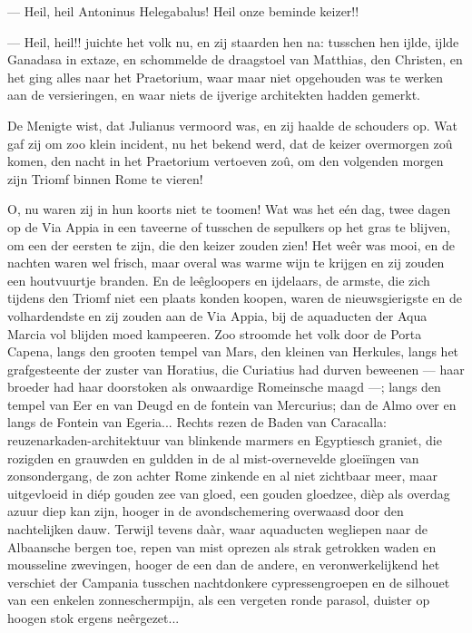\documentclass[a4paper, 12pt, oneside, dutch]{article}
\begin{document}
--- Heil, heil Antoninus Helegabalus! Heil onze beminde keizer!!

--- Heil, heil!! juichte het volk nu, en zij staarden hen na: tusschen hen ijlde, ijlde Ganadasa in extaze, en schommelde de draagstoel van Matthias, den Christen, en het ging alles naar het Praetorium, waar maar niet opgehouden was te werken aan de versieringen, en waar niets de ijverige architekten hadden gemerkt.

De Menigte wist, dat Julianus vermoord was, en zij haalde de schouders op. Wat gaf zij om zoo klein incident, nu het bekend werd, dat de keizer overmorgen zoû komen, den nacht in het Praetorium vertoeven zoû, om den volgenden morgen zijn Triomf binnen Rome te vieren!

O, nu waren zij in hun koorts niet te toomen! Wat was het eén dag, twee dagen op de Via Appia in een taveerne of tusschen de sepulkers op het gras te blijven, om een der eersten te zijn, die den keizer zouden zien! Het weêr was mooi, en de nachten waren wel frisch, maar overal was warme wijn te krijgen en zij zouden een houtvuurtje branden. En de leêgloopers en ijdelaars, de armste, die zich tijdens den Triomf niet een plaats konden koopen, waren de nieuwsgierigste en de volhardendste en zij zouden aan de Via Appia, bij de aquaducten der Aqua Marcia vol blijden moed kampeeren. Zoo stroomde het volk door de Porta Capena, langs den grooten tempel van Mars, den kleinen van Herkules, langs het grafgesteente der zuster van Horatius, die Curiatius had durven beweenen --- haar broeder had haar doorstoken als onwaardige Romeinsche maagd ---; langs den tempel van Eer en van Deugd en de fontein van Mercurius; dan de Almo over en langs de Fontein van Egeria... Rechts rezen de Baden van Caracalla: reuzenarkaden-architektuur van blinkende marmers en Egyptiesch graniet, die rozigden en grauwden en guldden in de al mist-overnevelde gloeiïngen van zonsondergang, de zon achter Rome zinkende en al niet zichtbaar meer, maar uitgevloeid in diép gouden zee van gloed, een gouden gloedzee, dièp als overdag azuur diep kan zijn, hooger in de avondschemering overwaasd door den nachtelijken dauw. Terwijl tevens daàr, waar aquaducten wegliepen naar de Albaansche bergen toe, repen van mist oprezen als strak getrokken waden en mousseline zwevingen, hooger de een dan de andere, en veronwerkelijkend het verschiet der Campania tusschen nachtdonkere cypressengroepen en de silhouet van een enkelen zonneschermpijn, als een vergeten ronde parasol, duister op hoogen stok ergens neêrgezet...
\end{document}
